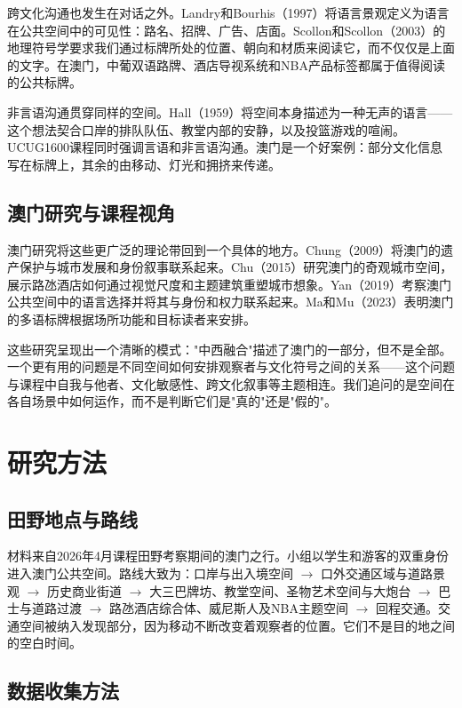 \documentclass[12pt,a4paper]{article}
\begin{document}
跨文化沟通也发生在对话之外。Landry和Bourhis（1997）将语言景观定义为语言在公共空间中的可见性：路名、招牌、广告、店面。Scollon和Scollon（2003）的地理符号学要求我们通过标牌所处的位置、朝向和材质来阅读它，而不仅仅是上面的文字。在澳门，中葡双语路牌、酒店导视系统和NBA产品标签都属于值得阅读的公共标牌。

非言语沟通贯穿同样的空间。Hall（1959）将空间本身描述为一种无声的语言——这个想法契合口岸的排队队伍、教堂内部的安静，以及投篮游戏的喧闹。UCUG1600课程同时强调言语和非言语沟通。澳门是一个好案例：部分文化信息写在标牌上，其余的由移动、灯光和拥挤来传递。

\subsection{澳门研究与课程视角}

澳门研究将这些更广泛的理论带回到一个具体的地方。Chung（2009）将澳门的遗产保护与城市发展和身份叙事联系起来。Chu（2015）研究澳门的奇观城市空间，展示路氹酒店如何通过视觉尺度和主题建筑重塑城市想象。Yan（2019）考察澳门公共空间中的语言选择并将其与身份和权力联系起来。Ma和Mu（2023）表明澳门的多语标牌根据场所功能和目标读者来安排。

这些研究呈现出一个清晰的模式："中西融合"描述了澳门的一部分，但不是全部。一个更有用的问题是不同空间如何安排观察者与文化符号之间的关系——这个问题与课程中自我与他者、文化敏感性、跨文化叙事等主题相连。我们追问的是空间在各自场景中如何运作，而不是判断它们是"真的"还是"假的"。

\section{研究方法}

\subsection{田野地点与路线}

材料来自2026年4月课程田野考察期间的澳门之行。小组以学生和游客的双重身份进入澳门公共空间。路线大致为：口岸与出入境空间 $\rightarrow$ 口外交通区域与道路景观 $\rightarrow$ 历史商业街道 $\rightarrow$ 大三巴牌坊、教堂空间、圣物艺术空间与大炮台 $\rightarrow$ 巴士与道路过渡 $\rightarrow$ 路氹酒店综合体、威尼斯人及NBA主题空间 $\rightarrow$ 回程交通。交通空间被纳入发现部分，因为移动不断改变着观察者的位置。它们不是目的地之间的空白时间。

\subsection{数据收集方法}
\end{document}
